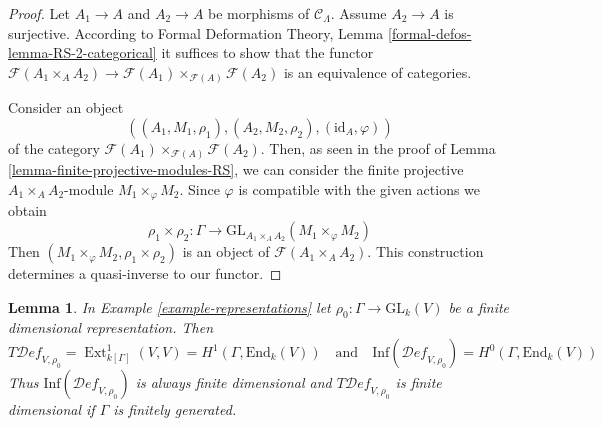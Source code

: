 \documentclass{stacks-project}
\theoremstyle{plain}
\newtheorem{lemma}[subsection]{Lemma}
\theoremstyle{definition}
\theoremstyle{remark}
\numberwithin{equation}{subsection}
\def\Ext{\mathop{\mathrm{Ext}}\nolimits}
\def\Deformationcategory{\mathcal{D}\!\mathit{ef}}
\begin{document}
\begin{proof}
Let $A_1 \to A$ and $A_2 \to A$ be morphisms of $\mathcal{C}_\Lambda$.
Assume $A_2 \to A$ is surjective. According to
Formal Deformation Theory, Lemma
\ref{formal-defos-lemma-RS-2-categorical}
it suffices to show that the functor
$\mathcal{F}(A_1 \times_A A_2) \to
\mathcal{F}(A_1) \times_{\mathcal{F}(A)} \mathcal{F}(A_2)$
is an equivalence of categories.

\medskip\noindent
Consider an object
$$
((A_1, M_1, \rho_1), (A_2, M_2, \rho_2), (\text{id}_A, \varphi))
$$
of the category $\mathcal{F}(A_1) \times_{\mathcal{F}(A)} \mathcal{F}(A_2)$.
Then, as seen in the proof of Lemma \ref{lemma-finite-projective-modules-RS},
we can consider the finite projective
$A_1 \times_A A_2$-module $M_1 \times_\varphi M_2$.
Since $\varphi$ is compatible with the given actions we obtain
$$
\rho_1 \times \rho_2 : \Gamma \longrightarrow
\text{GL}_{A_1 \times_A A_2}(M_1 \times_\varphi M_2)
$$
Then $(M_1 \times_\varphi M_2, \rho_1 \times \rho_2)$
is an object of $\mathcal{F}(A_1 \times_A A_2)$.
This construction determines a quasi-inverse to our functor.
\end{proof}

\begin{lemma}
\label{lemma-representations-TI}
In Example \ref{example-representations} let 
$\rho_0 : \Gamma \to \text{GL}_k(V)$
be a finite dimensional representation. Then
$$
T\Deformationcategory_{V, \rho_0} = \Ext^1_{k[\Gamma]}(V, V) =
H^1(\Gamma, \text{End}_k(V))
\quad\text{and}\quad
\text{Inf}(\Deformationcategory_{V, \rho_0}) = H^0(\Gamma, \text{End}_k(V))
$$
Thus $\text{Inf}(\Deformationcategory_{V, \rho_0})$
is always finite dimensional
and $T\Deformationcategory_{V, \rho_0}$ is finite dimensional
if $\Gamma$ is finitely generated.
\end{lemma}
\end{document}
